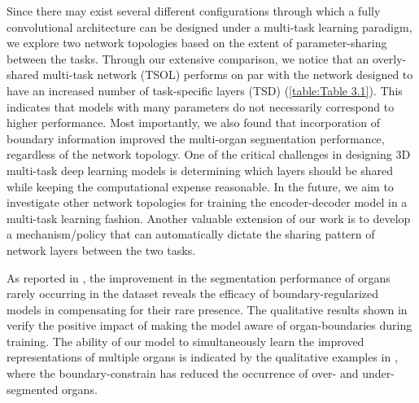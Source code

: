 \documentclass[final,5p,times,twocolumn]{elsarticle}
\begin{document}
Since there may exist several different configurations through which a fully convolutional architecture can be designed under a multi-task learning paradigm, we explore two network topologies based on the extent of parameter-sharing between the tasks. Through our extensive comparison, we notice that an overly-shared multi-task network (TSOL) performs on par with the network designed to have an increased number of task-specific layers (TSD) (\autoref{table:Table 3.1}). This indicates that models with many parameters do not necessarily correspond to higher performance. Most importantly, we also found that incorporation of boundary information improved the multi-organ segmentation performance, regardless of the network topology. One of the critical challenges in designing 3D multi-task deep learning models is determining which layers should be shared while keeping the computational expense reasonable. In the future, we aim to investigate other network topologies for training the encoder-decoder model in a multi-task learning fashion. Another valuable extension of our work is to develop a mechanism/policy that can automatically dictate the sharing pattern of network layers between the two tasks.

As reported in , the improvement in the segmentation performance of organs rarely occurring in the dataset reveals the efficacy of boundary-regularized models in compensating for their rare presence. The qualitative results shown in  verify the positive impact of making the model aware of organ-boundaries during training. The ability of our model to simultaneously learn the improved representations of multiple organs is indicated by the qualitative examples in , where the boundary-constrain has reduced the occurrence of over- and under-segmented organs.
\end{document}
